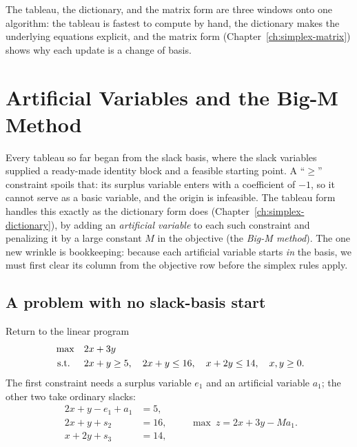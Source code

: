 The tableau, the dictionary, and the matrix form are three windows onto one algorithm: the tableau is fastest to compute by hand, the dictionary makes the underlying equations explicit, and the matrix form (Chapter~\ref{ch:simplex-matrix}) shows why each update is a change of basis.

\section{Artificial Variables and the Big-M Method}
\label{sec:tableau-bigm}

Every tableau so far began from the slack basis, where the slack variables supplied a ready-made identity block and a feasible starting point. A ``$\ge$'' constraint spoils that: its surplus variable enters with a coefficient of $-1$, so it cannot serve as a basic variable, and the origin is infeasible. The tableau form handles this exactly as the dictionary form does (Chapter~\ref{ch:simplex-dictionary}), by adding an \emph{artificial variable} to each such constraint and penalizing it by a large constant $M$ in the objective (the \emph{Big-M method}). The one new wrinkle is bookkeeping: because each artificial variable starts \emph{in} the basis, we must first clear its column from the objective row before the simplex rules apply.

\subsection{A problem with no slack-basis start}

Return to the linear program
\[
\begin{aligned}
\max\quad & 2x + 3y \\
\mbox{ s.t. }\quad & 2x + y \geq 5,\quad 2x + y \leq 16,\quad x + 2y \leq 14,\quad x,y\ge 0.
\end{aligned}
\]
The first constraint needs a surplus variable $e_1$ and an artificial variable $a_1$; the other two take ordinary slacks:
\[
\begin{aligned}
2x + y - e_1 + a_1 &= 5,\\
2x + y + s_2 &= 16,\\
x + 2y + s_3 &= 14,
\end{aligned}
\qquad
\max\ z = 2x + 3y - M a_1 .
\]


